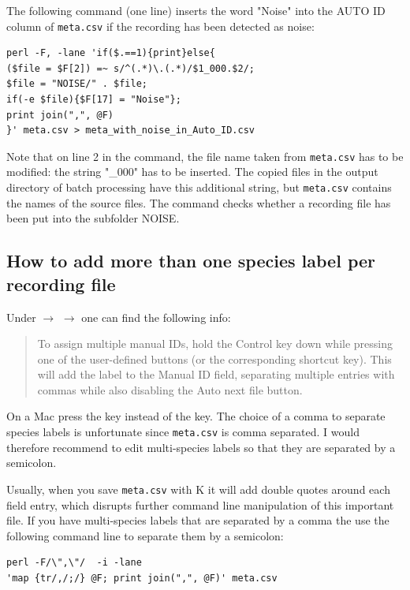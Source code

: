 \documentclass[English, 11pt, twoside, authoryear]{article}
\begin{document}
The following command (one line) inserts the word "Noise" into the AUTO ID column of \texttt{meta.csv} if the recording has been detected as noise:

\begin{lstlisting}
perl -F, -lane 'if($.==1){print}else{
($file = $F[2]) =~ s/^(.*)\.(.*)/$1_000.$2/; 
$file = "NOISE/" . $file; 
if(-e $file){$F[17] = "Noise"}; 
print join(",", @F)
}' meta.csv > meta_with_noise_in_Auto_ID.csv
\end{lstlisting}

Note that on line 2 in the command, the file name taken from \texttt{meta.csv} has to be modified: the string "\_000" has to be inserted. The copied files in the output directory of batch processing have this additional string, but \texttt{meta.csv} contains the names of the source files. The command checks whether a recording file has been put into the subfolder NOISE.

%
%
\subsection{How to add more than one species label per recording file}
%
%

Under  $\rightarrow$  $\rightarrow$  one can find the following info:

\begin{quote}
To assign multiple manual IDs, hold the Control key down while pressing one of the user-defined buttons (or the corresponding shortcut key). This will add the label to the Manual ID field, separating multiple entries with commas while also disabling the Auto next file button. 
\end{quote}

On a Mac press the  key instead of the  key. The choice of a comma to separate species labels is unfortunate since \texttt{meta.csv} is comma separated. I would therefore recommend to edit multi-species labels so that they are separated by a semicolon.

Usually, when you save \texttt{meta.csv} with \textsf{K} it will add double quotes around each field entry, which disrupts further command line manipulation of this important file. If you have multi-species labels that are separated by a comma the use the following command line to separate them by a semicolon:

\begin{lstlisting}[numbers=none]
perl -F/\",\"/  -i -lane 
'map {tr/,/;/} @F; print join(",", @F)' meta.csv
\end{lstlisting}
\end{document}
